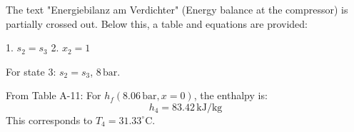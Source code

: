 The text "Energiebilanz am Verdichter" (Energy balance at the compressor) is partially crossed out. Below this, a table and equations are provided:  

1. \( s_2 = s_3 \)  
2. \( x_2 = 1 \)  

For state 3:  
\( s_2 = s_3 \), \( 8 \, \text{bar} \).

From Table A-11:  
For \( h_f(8.06 \, \text{bar}, x = 0) \), the enthalpy is:  
\[
h_4 = 83.42 \, \text{kJ/kg}
\]  
This corresponds to \( T_4 = 31.33^\circ\text{C} \).